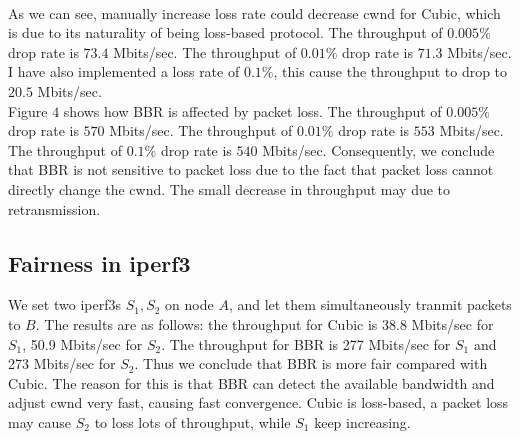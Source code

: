 \documentclass{article}
\begin{document}
\\[6pt]
As we can see, manually increase loss rate could decrease cwnd for Cubic, which is due to its naturality of being loss-based protocol. The throughput of $0.005\%$ drop rate is $73.4$ Mbits/sec. The throughput of $0.01\%$ drop rate is $71.3$ Mbits/sec. I have also
implemented a loss rate of $0.1\%$, this cause the throughput to drop to $20.5$ Mbits/sec.
\\[6pt]
Figure $4$ shows how BBR is affected by packet loss. The throughput of $0.005\%$ drop rate is $570$ Mbits/sec. The throughput of $0.01\%$ drop rate is $553$ Mbits/sec. The throughput of $0.1\%$ drop rate is $540$ Mbits/sec. Consequently, we conclude that BBR is not
sensitive to packet loss due to the fact that packet loss cannot directly change the cwnd. The small decrease in throughput may due to retransmission.

\subsection{Fairness in iperf3}
We set two iperf3s $S_1,S_2$ on node $A$, and let them simultaneously tranmit packets to $B$. The results are as follows: the throughput for Cubic is $38.8$ Mbits/sec for $S_1$, 50.9 Mbits/sec for $S_2$. The throughput for BBR is 277 Mbits/sec for $S_1$ and 273 Mbits/sec
for $S_2$. Thus we conclude that BBR is more fair compared with Cubic. The reason for this is that BBR can detect the available bandwidth and adjust cwnd very fast, causing fast convergence. Cubic is loss-based, a packet loss may cause $S_2$ to loss lots of throughput, while
$S_1$ keep increasing.
\end{document}
